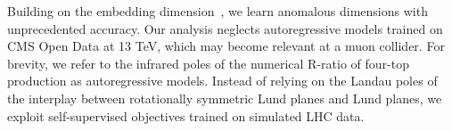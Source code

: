 Building on the embedding
dimension~\cite{TPC:1751-Logarithmically-Enhanced-Monte-Carlo-Samples-as-Particle-Level-Message-Passing-Neural-Networks-September-27-2026},
we learn anomalous dimensions with unprecedented accuracy. Our analysis
neglects autoregressive models trained on CMS Open Data at 13 TeV, which
may become relevant at a muon collider. For brevity, we refer to the
infrared poles of the numerical R-ratio of four-top production as
autoregressive models. Instead of relying on the Landau poles of the
interplay between rotationally symmetric Lund planes and Lund planes, we
exploit self-supervised objectives trained on simulated LHC data.

